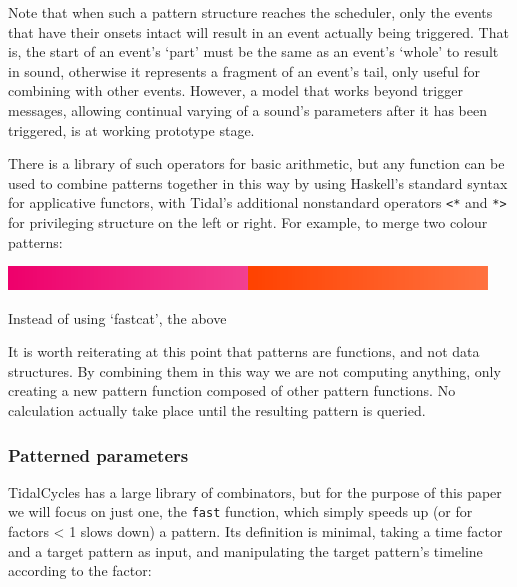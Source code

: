 \documentclass[
]{article}
\newenvironment{Shaded}{\begin{snugshade}}{\end{snugshade}}
\newcommand{\DecValTok}[1]{\textcolor[rgb]{0.00,0.00,0.81}{#1}}
\newcommand{\NormalTok}[1]{#1}
\newcommand{\OperatorTok}[1]{\textcolor[rgb]{0.81,0.36,0.00}{\textbf{#1}}}
\newcommand{\StringTok}[1]{\textcolor[rgb]{0.31,0.60,0.02}{#1}}
\begin{document}
Note that when such a pattern structure reaches the scheduler, only the
events that have their onsets intact will result in an event actually
being triggered. That is, the start of an event's `part' must be the
same as an event's `whole' to result in sound, otherwise it represents a
fragment of an event's tail, only useful for combining with other
events. However, a model that works beyond trigger messages, allowing
continual varying of a sound's parameters after it has been triggered,
is at working prototype stage.

There is a library of such operators for basic arithmetic, but any
function can be used to combine patterns together in this way by using
Haskell's standard syntax for applicative functors, with Tidal's
additional nonstandard operators \texttt{\textless{}*} and
\texttt{*\textgreater{}} for privileging structure on the left or right.
For example, to merge two colour patterns:

\begin{Shaded}
\end{Shaded}

\includegraphics[width=5in,height=\textheight]{figures/bd8761a5cc87209b083bb9fdc4fe12b9_gradient_0.pdf}

Instead of using `fastcat', the above

It is worth reiterating at this point that patterns are functions, and
not data structures. By combining them in this way we are not computing
anything, only creating a new pattern function composed of other pattern
functions. No calculation actually take place until the resulting
pattern is queried.

\hypertarget{patterned-parameters}{%
\subsubsection{Patterned parameters}\label{patterned-parameters}}

TidalCycles has a large library of combinators, but for the purpose of
this paper we will focus on just one, the \texttt{fast} function, which
simply speeds up (or for factors \textless{} 1 slows down) a pattern.
Its definition is minimal, taking a time factor and a target pattern as
input, and manipulating the target pattern's timeline according to the
factor:
\end{document}
